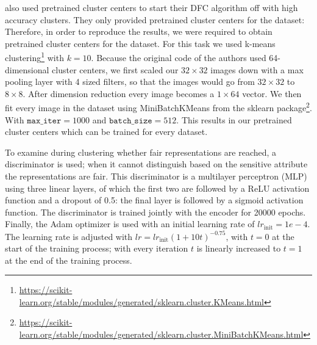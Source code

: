 \citet{Li_2020_CVPR} also used pretrained cluster centers to start their DFC algorithm off with high accuracy clusters. They only provided pretrained cluster centers for the \USPSMNIST dataset: Therefore, in order to reproduce the results, we were required to obtain pretrained cluster centers for the \revMNIST dataset. For this task we used k-means clustering\footnote{\url{https://scikit-learn.org/stable/modules/generated/sklearn.cluster.KMeans.html}} with $k=10$. Because the original code of the authors used 64-dimensional cluster centers, we first scaled our $32\times 32$ images down with a max pooling layer with 4 sized filters, so that the images would go from $32\times 32$ to $8\times 8$. After dimension reduction every image becomes a $1\times 64$ vector. We then fit every image in the dataset using MiniBatchKMeans from the sklearn package\footnote{\url{https://scikit-learn.org/stable/modules/generated/sklearn.cluster.MiniBatchKMeans.html}}. With $\texttt{max\_iter}=1000$ and $\texttt{batch\_size} = 512$. This results in our pretrained cluster centers which can be trained for every dataset.

To examine during clustering whether fair representations are reached, a discriminator is used; when it cannot distinguish based on the sensitive attribute the representations are fair. This discriminator is a multilayer perceptron (MLP) using three linear layers, of which the first two are followed by a ReLU activation function and a dropout of 0.5: the final layer is followed by a sigmoid activation function. The discriminator is trained jointly with the encoder for 20000 epochs. Finally, the Adam optimizer is used with an initial learning rate of $lr_{\text{init}}=1e-4$. The learning rate is adjusted with $lr =lr_{\text{init}}(1+10t)^{-0.75}$, with $t=0$ at the start of the training process; with every iteration $t$ is linearly increased to $t=1$ at the end of the training process.





